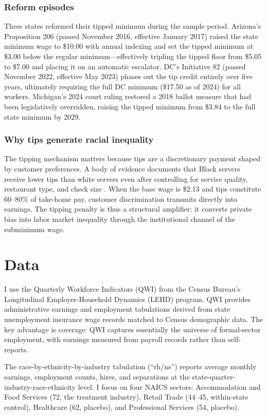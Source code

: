 \documentclass[12pt]{article}
\begin{document}
\subsubsection*{Reform episodes} Three states reformed their tipped minimum during the sample period. Arizona's Proposition 206 (passed November 2016, effective January 2017) raised the state minimum wage to \$10.00 with annual indexing and set the tipped minimum at \$3.00 below the regular minimum---effectively tripling the tipped floor from \$5.05 to \$7.00 and placing it on an automatic escalator. DC's Initiative 82 (passed November 2022, effective May 2023) phases out the tip credit entirely over five years, ultimately requiring the full DC minimum (\$17.50 as of 2024) for all workers. Michigan's 2024 court ruling restored a 2018 ballot measure that had been legislatively overridden, raising the tipped minimum from \$3.84 to the full state minimum by 2029.

\subsubsection*{Why tips generate racial inequality} The tipping mechanism matters because tips are a discretionary payment shaped by customer preferences. A body of evidence documents that Black servers receive lower tips than white servers even after controlling for service quality, restaurant type, and check size \citep{lynn2008tipping, lynn2013racediff}. When the base wage is \$2.13 and tips constitute 60--80\% of take-home pay, customer discrimination transmits directly into earnings. The tipping penalty is thus a structural amplifier: it converts private bias into labor market inequality through the institutional channel of the subminimum wage.

\section{Data}

I use the Quarterly Workforce Indicators (QWI) from the Census Bureau's Longitudinal Employer-Household Dynamics (LEHD) program. QWI provides administrative earnings and employment tabulations derived from state unemployment insurance wage records matched to Census demographic data. The key advantage is coverage: QWI captures essentially the universe of formal-sector employment, with earnings measured from payroll records rather than self-reports.

The race-by-ethnicity-by-industry tabulation (``rh/ns'') reports average monthly earnings, employment counts, hires, and separations at the state-quarter-industry-race-ethnicity level. I focus on four NAICS sectors: Accommodation and Food Services (72, the treatment industry), Retail Trade (44--45, within-state control), Healthcare (62, placebo), and Professional Services (54, placebo).
\end{document}
